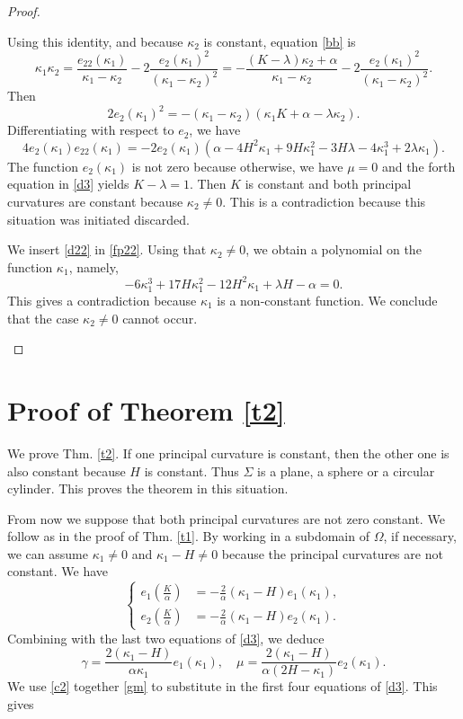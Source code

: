 \documentclass[a4paper,12pt]{amsart}
\theoremstyle{definition}
\begin{document}
\begin{proof}
\begin{enumerate}
Using this identity, and because $\kappa_2$ is constant, equation \eqref{bb} is 
$$\kappa_1\kappa_2=\frac{e_{22}(\kappa_1)}{\kappa_1-\kappa_2}-2\frac{e_2(\kappa_1)^2}{(\kappa_1-\kappa_2)^2}=
-\frac{(K-\lambda)\kappa_2+\alpha}{\kappa_1-\kappa_2}-2\frac{e_2(\kappa_1)^2}{(\kappa_1-\kappa_2)^2}.$$
 Then 
 $$2e_2(\kappa_1)^2=-(\kappa_1-\kappa_2)(\kappa_1 K+\alpha-\lambda\kappa_2).$$
 Differentiating with respect to $e_2$, we have 
 \begin{equation}\label{fp22}
4e_2(\kappa_1)e_{22}(\kappa_1)=-2e_2(\kappa_1)\left(   \alpha -4 H^2 \kappa_1+9 H \kappa_1^2-3 H \lambda -4 \kappa_1^3+2 \lambda  \kappa_1 \right).
\end{equation}
 The function  $e_2(\kappa_1)$ is not zero because otherwise, we have $\mu=0$ and the forth equation in \eqref{d3} yields $K-\lambda=1$. Then  $K$ is constant and  both principal curvatures are constant because $\kappa_2\not=0$. This is a contradiction because this situation was initiated discarded.
 
   
  
 We insert  \eqref{d22} in \eqref{fp22}. Using that $\kappa_2\not=0$, we obtain  a polynomial on the function $\kappa_1$, namely, 
 $$-6 \kappa_1^3+17H\kappa_1^2-12H^2\kappa_1+\lambda H-\alpha =0.$$
  This gives a contradiction because $\kappa_1$ is a non-constant function. We conclude that the case $\kappa_2\not=0$ cannot occur.
 \end{enumerate}
  \end{proof}
 
 
\section{Proof of Theorem \ref{t2}}\label{s6}
 

We   prove Thm. \ref{t2}. If one principal curvature is constant, then the other one is also constant because $H$ is constant. Thus $\Sigma$ is a plane, a sphere or a circular cylinder.  This proves the theorem in this situation. 

From now we suppose that both principal curvatures are not zero constant. We follow as in the proof of Thm. \ref{t1}. By working in a subdomain of $\Omega$, if necessary, we can assume $\kappa_1\not=0$ and $\kappa_1-H\not=0$ because the principal curvatures are not constant. We have 
\begin{equation*}
\left\{
\begin{split}
e_1(\frac{K}{\alpha})&=-\frac{2}{\alpha}(\kappa_1-H)e_1(\kappa_1),\\
e_2(\frac{K}{\alpha})&=-\frac{2}{\alpha}(\kappa_1-H)e_2(\kappa_1).
\end{split}\right.
\end{equation*}
Combining with the last two equations of \eqref{d3}, we deduce
\begin{equation}\label{gm}
\gamma=\frac{2(\kappa_1-H)}{\alpha\kappa_1}e_1(\kappa_1),\quad \mu=\frac{2(\kappa_1-H)}{\alpha(2H-\kappa_1)}e_2(\kappa_1).
\end{equation}
We use \eqref{c2} together \eqref{gm} to substitute in the  first four equations of \eqref{d3}. This gives 
  
\end{document}
